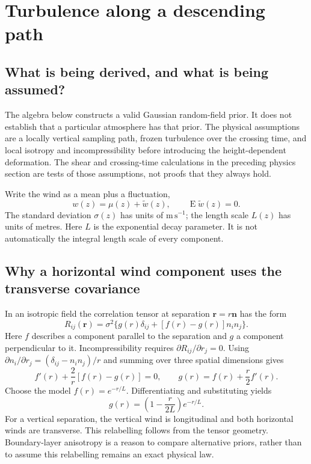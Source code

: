 \section{Turbulence along a descending path}
\label{sec:turbulence}

\subsection{What is being derived, and what is being assumed?}
The algebra below constructs a valid Gaussian random-field prior. It does not establish that a particular atmosphere has that prior. The physical assumptions are a locally vertical sampling path, frozen turbulence over the crossing time, and local isotropy and incompressibility before introducing the height-dependent deformation. The shear and crossing-time calculations in the preceding physics section are tests of those assumptions, not proofs that they always hold.

Write the wind as a mean plus a fluctuation,
\begin{equation}
 w(z)=\mu(z)+\widetilde w(z),\qquad \operatorname{E}\widetilde w(z)=0.
\end{equation}
The standard deviation $\sigma(z)$ has units of $\mathrm{m\,s^{-1}}$; the length scale $L(z)$ has units of metres. Here $L$ is the exponential decay parameter. It is not automatically the integral length scale of every component.

\subsection{Why a horizontal wind component uses the transverse covariance}
In an isotropic field the correlation tensor at separation $\mathbf r=r\mathbf n$ has the form
\begin{equation}
 R_{ij}(\mathbf r)=\sigma^2\{g(r)\delta_{ij}+[f(r)-g(r)]n_i n_j\}.
\end{equation}
Here $f$ describes a component parallel to the separation and $g$ a component perpendicular to it. Incompressibility requires $\partial R_{ij}/\partial r_j=0$. Using $\partial n_i/\partial r_j=(\delta_{ij}-n_i n_j)/r$ and summing over three spatial dimensions gives
\begin{equation}
 f'(r)+\frac{2}{r}[f(r)-g(r)]=0,
 \qquad \boxed{g(r)=f(r)+\frac r2 f'(r).}
\end{equation}
Choose the model $f(r)=e^{-r/L}$. Differentiating and substituting yields
\begin{equation}
 \boxed{g(r)=\left(1-\frac{r}{2L}\right)e^{-r/L}.}
\end{equation}
For a vertical separation, the vertical wind is longitudinal and both horizontal winds are transverse. This relabelling follows from the tensor geometry. Boundary-layer anisotropy is a reason to compare alternative priors, rather than to assume this relabelling remains an exact physical law.

